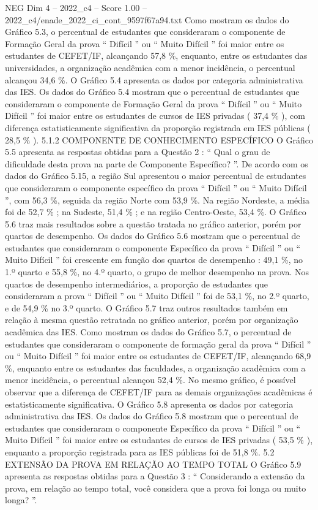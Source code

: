 \begin{textsample}{NEG Dim 4 – 2022\_c4 – Score 1.00 – 2022\_c4/enade\_2022\_ci\_cont\_9597f67a94.txt}
Como mostram os dados do Gráfico 5.3, o percentual de estudantes que consideraram o componente de Formação Geral da prova “ Difícil ” ou “ Muito Difícil ” foi maior entre os estudantes de CEFET/IF, alcançando 57,8 \%, enquanto, entre os estudantes das universidades, a organização acadêmica com a menor incidência, o percentual alcançou 34,6 \%.
O Gráfico 5.4 apresenta os dados por categoria administrativa das IES.
Os dados do Gráfico 5.4 mostram que o percentual de estudantes que consideraram o componente de Formação Geral da prova “ Difícil ” ou “ Muito Difícil ” foi maior entre os estudantes de cursos de IES privadas ( 37,4 \% ), com diferença estatisticamente significativa da proporção registrada em IES públicas ( 28,5 \% ). 5.1.2 COMPONENTE DE CONHECIMENTO ESPECÍFICO O Gráfico 5.5 apresenta as respostas obtidas para a Questão 2 : “ Qual o grau de dificuldade desta prova na parte de Componente Específico? ”.
De acordo com os dados do Gráfico 5.15, a região Sul apresentou o maior percentual de estudantes que consideraram o componente específico da prova “ Difícil ” ou “ Muito Difícil ”, com 56,3 \%, seguida da região Norte com 53,9 \%.
Na região Nordeste, a média foi de 52,7 \% ; na Sudeste, 51,4 \% ; e na região Centro-Oeste, 53,4 \%.
O Gráfico 5.6 traz mais resultados sobre a questão tratada no gráfico anterior, porém por quartos de desempenho.
Os dados do Gráfico 5.6 mostram que o percentual de estudantes que consideraram o componente Específico da prova “ Difícil ” ou “ Muito Difícil ” foi crescente em função dos quartos de desempenho : 49,1 \%, no 1.º quarto e 55,8 \%, no 4.º quarto, o grupo de melhor desempenho na prova.
Nos quartos de desempenho intermediários, a proporção de estudantes que consideraram a prova “ Difícil ” ou “ Muito Difícil ” foi de 53,1 \%, no 2.º quarto, e de 54,9 \% no 3.º quarto.
O Gráfico 5.7 traz outros resultados também em relação à mesma questão retratada no gráfico anterior, porém por organização acadêmica das IES.
Como mostram os dados do Gráfico 5.7, o percentual de estudantes que consideraram o componente de formação geral da prova “ Difícil ” ou “ Muito Difícil ” foi maior entre os estudantes de CEFET/IF, alcançando 68,9 \%, enquanto entre os estudantes das faculdades, a organização acadêmica com a menor incidência, o percentual alcançou 52,4 \%.
No mesmo gráfico, é possível observar que a diferença de CEFET/IF para as demais organizações acadêmicas é estatisticamente significativa.
O Gráfico 5.8 apresenta os dados por categoria administrativa das IES.
Os dados do Gráfico 5.8 mostram que o percentual de estudantes que consideraram o componente Específico da prova “ Difícil ” ou “ Muito Difícil ” foi maior entre os estudantes de cursos de IES privadas ( 53,5 \% ), enquanto a proporção registrada para as IES públicas foi de 51,8 \%. 5.2 EXTENSÃO DA PROVA EM RELAÇÃO AO TEMPO TOTAL O Gráfico 5.9 apresenta as respostas obtidas para a Questão 3 : “ Considerando a extensão da prova, em relação ao tempo total, você considera que a prova foi longa ou muito longa? ”.

\end{textsample}
